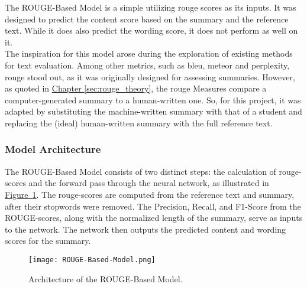 The ROUGE-Based Model is a simple  utilizing \gls{rouge} scores as its inputs. It was designed to predict the content score based on the summary and the reference text. While it does also predict the wording score, it does not perform as well on it.\\
The inspiration for this model arose during the exploration of existing methods for text evaluation. Among other metrics, such as \gls{bleu}, \gls{meteor} and \gls{perplexity}, \gls{rouge} stood out, as it was originally designed for assessing summaries.
However, as quoted in
\hyperref[sec:rouge_theory]{Chapter \ref{sec:rouge_theory}},
the \gls{rouge} Measures compare a computer-generated summary to a human-written one. So, for this project, it was adapted by substituting the machine-written summary with that of a student and replacing the (ideal) human-written summary with the full reference text.\\
\subsubsection{Model Architecture}
The ROUGE-Based Model consists of two distinct steps: the calculation of \gls{rouge}-scores and the forward pass through the neural network, as illustrated in
\hyperref[fig:rouge-based-model]{Figure~\ref{fig:rouge-based-model}}.
The \gls{rouge}-scores are computed from the  reference text and summary, after their stopwords were removed. The Precision, Recall, and F1-Score from the ROUGE-scores, along with the normalized length of the summary, serve as inputs to the network. The network then outputs the predicted content and wording scores for the summary.
\begin{figure}[H]
\texttt{[image: ROUGE-Based-Model.png]}
\caption[ROUGE-Based Model Architecture]{Architecture of the ROUGE-Based Model.}
\label{fig:rouge-based-model}
\end{figure}

